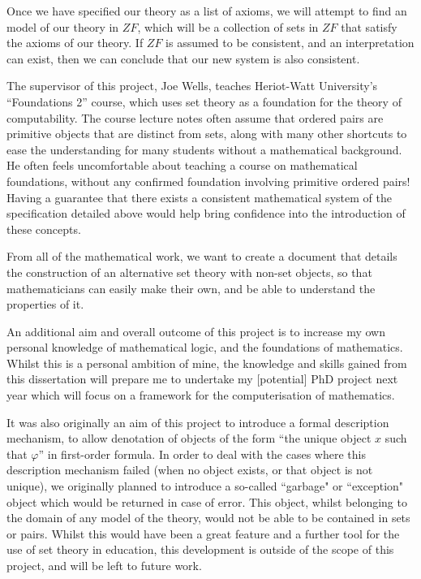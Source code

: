 \documentclass[11pt]{report}
\theoremstyle{definition}
\theoremstyle{theorem}
\theoremstyle{lemma}
\begin{document}
Once we have specified our theory as a list of axioms, we will attempt to find an model of our theory in $\mathit{ZF}$, which will be a collection of sets in $\mathit{ZF}$ that satisfy the axioms of our theory.
If $\mathit{ZF}$ is assumed to be consistent, and an interpretation can exist, then we can conclude that our new system is also consistent.

The supervisor of this project, Joe Wells, teaches Heriot-Watt University's ``Foundations 2'' course, which uses set theory as a foundation for the theory of computability.
The course lecture notes often assume that ordered pairs are primitive objects that are distinct from sets, along with many other shortcuts to ease the understanding for many students without a mathematical background.  
He often feels uncomfortable about teaching a course on mathematical foundations, without any confirmed foundation involving primitive ordered pairs! 
Having a guarantee that there exists a consistent mathematical system of the specification detailed above would help bring confidence into the introduction of these concepts.

From all of the mathematical work, we want to create a document that details the construction of an alternative set theory with non-set objects, so that mathematicians can easily make their own, and be able to understand the properties of it.

An additional aim and overall outcome of this project is to increase my own personal knowledge of mathematical logic, and the foundations of mathematics.
Whilst this is a personal ambition of mine, the knowledge and skills gained from this dissertation will prepare me to undertake my [potential] PhD project next year which will focus on a framework for the computerisation of mathematics.

It was also originally an aim of this project to introduce a formal description mechanism, to allow denotation of objects of the form ``the unique object $x$ such that $\varphi$'' in first-order formula.
In order to deal with the cases where this description mechanism failed (when no object exists, or that object is not unique), we originally planned to introduce a so-called ``garbage" or ``exception" object which would be returned in case of error.
This object, whilst belonging to the domain of any model of the theory, would not be able to be contained in sets or pairs.
Whilst this would have been a great feature and a further tool for the use of set theory in education, this development is outside of the scope of this project, and will be left to future work.
\end{document}
